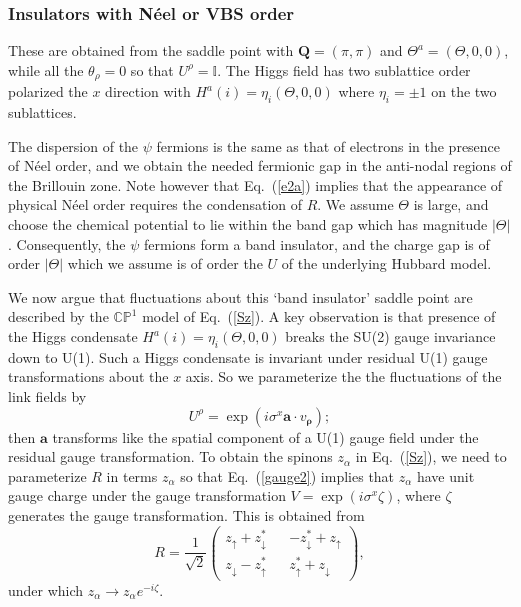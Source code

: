 \documentclass[aps,prb,preprint,onecolumn,citeautoscript,superscriptaddress,footinbib,
eqsecnum]{revtex4-1}
\newcommand{\beq}{\begin{equation}}
\newcommand{\eeq}{\end{equation}}
\begin{document}
\subsubsection{Insulators with N\'eel or VBS order}
\label{sec:neel}

These are obtained from the saddle point with ${\bm Q} = (\pi, \pi)$ and 
$\Theta^a = (\Theta, 0, 0)$, while all the $\theta_\rho = 0$ so that $U^\rho = \mathbb{I}$. The Higgs field has two sublattice
order polarized the $x$ direction with $H^a (i) = \eta_i (\Theta, 0, 0)$ where $\eta_i = \pm 1$ on the two sublattices. 

The dispersion of
the $\psi$ fermions is the same as that of electrons in the presence of N\'eel order, and we obtain
the needed fermionic gap in the anti-nodal regions of the Brillouin zone.
Note however that Eq.~(\ref{e2a}) implies 
that the appearance of physical N\'eel order requires the condensation of $R$. We assume $\Theta$ is large, and choose
the chemical potential to lie within the band gap which has magnitude $|\Theta|$. Consequently, the $\psi$ fermions form a band insulator, and the charge gap is of order $|\Theta|$ which we assume
is of order the $U$ of the underlying Hubbard model.

We now argue that fluctuations about this `band insulator' 
saddle point are described by the $\mathbb{CP}^1$ model of Eq.~(\ref{Sz}). 
A key observation is that presence of the Higgs condensate $H^a (i) = \eta_i (\Theta, 0, 0)$ breaks the SU(2) gauge invariance
down to U(1). Such a Higgs condensate is invariant under residual U(1) gauge transformations about the $x$ axis. 
So we parameterize the the fluctuations of the link fields by
\beq
U^\rho = \exp \left( i \sigma^x {\bm a} \cdot v_{{\bm \rho}} \right); \label{UCP1}
\eeq
then ${\bm a}$ transforms like the spatial component of a U(1) gauge field under the residual gauge transformation. 
To obtain the spinons $z_\alpha$ in Eq.~(\ref{Sz}), we need to parameterize $R$ in terms $z_\alpha$ so that Eq.~(\ref{gauge2})
implies that $z_\alpha$ have unit gauge charge under the gauge transformation $V = \exp (i \sigma^x \zeta)$, where $\zeta$ generates
the gauge transformation. This is obtained from
\beq
R = \frac{1}{\sqrt{2}} 
\left( \begin{array}{ccc} z_\uparrow + z_\downarrow^\ast & & -z_\downarrow^\ast + z_\uparrow \\
z_\downarrow - z_\uparrow^\ast & & z_\uparrow^\ast + z_\downarrow
\end{array} \right), \label{Rz}
\eeq
under which $z_\alpha \rightarrow z_\alpha e^{-i \zeta}$.
\end{document}
